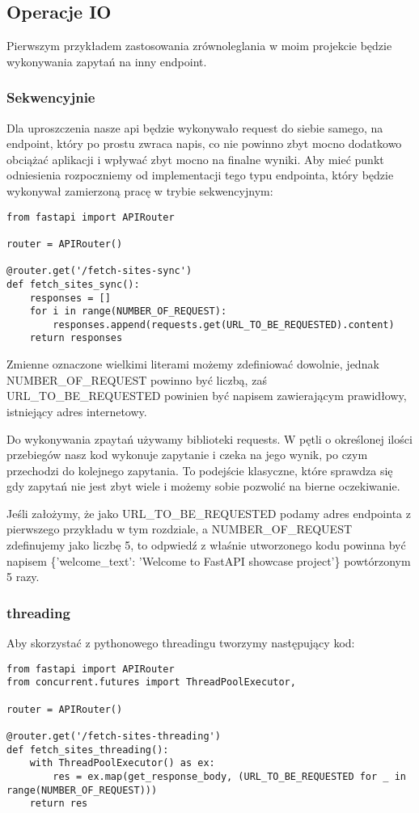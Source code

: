 \subsection{Operacje IO}
Pierwszym przykładem zastosowania zrównoleglania w moim projekcie będzie wykonywania zapytań na inny endpoint. 
\subsubsection{Sekwencyjnie}
Dla uproszczenia nasze api będzie wykonywało request do siebie samego, na endpoint, który po prostu zwraca napis, co nie powinno zbyt mocno dodatkowo obciążać aplikacji i wpływać zbyt mocno na finalne wyniki. Aby mieć punkt odniesienia rozpoczniemy od implementacji tego typu endpointa, który będzie wykonywał zamierzoną pracę w trybie sekwencyjnym:
\begin{lstlisting}
from fastapi import APIRouter

router = APIRouter()

@router.get('/fetch-sites-sync')
def fetch_sites_sync():
    responses = []
    for i in range(NUMBER_OF_REQUEST):
        responses.append(requests.get(URL_TO_BE_REQUESTED).content)
    return responses
\end{lstlisting}
Zmienne oznaczone wielkimi literami możemy zdefiniować dowolnie, jednak NUMBER\_OF\_REQUEST powinno być liczbą, zaś URL\_TO\_BE\_REQUESTED powinien być napisem zawierającym prawidłowy, istniejący adres internetowy.

Do wykonywania zpaytań używamy biblioteki requests. W pętli o określonej ilości przebiegów nasz kod wykonuje zapytanie i czeka na jego wynik, po czym przechodzi do kolejnego zapytania. To podejście klasyczne, które sprawdza się gdy zapytań nie jest zbyt wiele i możemy sobie pozwolić na bierne oczekiwanie.

Jeśli założymy, że jako URL\_TO\_BE\_REQUESTED podamy adres endpointa z pierwszego przykładu w tym rozdziale, a NUMBER\_OF\_REQUEST zdefinujemy jako liczbę 5, to odpwiedź z właśnie utworzonego kodu powinna być napisem \{'welcome\_text': 'Welcome to FastAPI showcase project'\} powtórzonym 5 razy.

\subsubsection{threading}
Aby skorzystać z pythonowego threadingu tworzymy następujący kod:
\begin{lstlisting}
from fastapi import APIRouter
from concurrent.futures import ThreadPoolExecutor,

router = APIRouter()

@router.get('/fetch-sites-threading')
def fetch_sites_threading():
    with ThreadPoolExecutor() as ex:
        res = ex.map(get_response_body, (URL_TO_BE_REQUESTED for _ in range(NUMBER_OF_REQUEST)))
    return res
\end{lstlisting}

